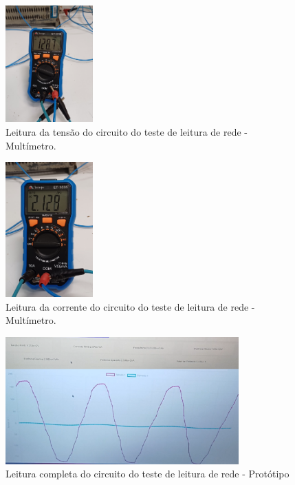 \begin{figure}[htb!]
    \caption{Leitura da tensão do circuito do teste de leitura de rede - Multímetro.}
    \label{fig:leitura-rede-mult-t}
    \includegraphics[width=0.3\textwidth]{figuras/leitura-rede-mult-t.png}
    \fonte{}
\end{figure}

\begin{figure}[htb!]
    \caption{Leitura da corrente do circuito do teste de leitura de rede - Multímetro.}
    \label{fig:leitura-rede-mult-c}
    \includegraphics[width=0.3\textwidth]{figuras/leitura-rede-mult-c.png}
    \fonte{}
\end{figure}

\begin{figure}[htb!]
    \caption{Leitura completa do circuito do teste de leitura de rede - Protótipo}
    \label{fig:leitura-rede-boy-ondas}
    \includegraphics[width=0.8\textwidth]{figuras/leitura-rede-boy-ondas.png}
    \fonte{}
\end{figure}

